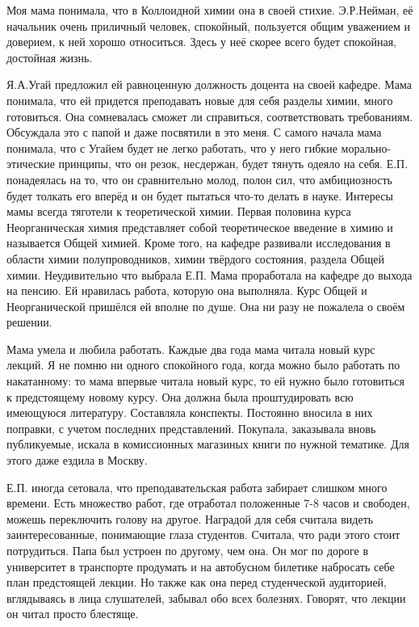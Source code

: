 Моя мама понимала, что в Коллоидной химии она в своей стихие. Э.Р.Нейман, её начальник очень приличный человек, спокойный, пользуется общим уважением и доверием, к ней хорошо относиться. Здесь у неё скорее всего будет спокойная, достойная жизнь.

Я.А.Угай предложил ей равноценную должность доцента на своей кафедре. Мама понимала, что ей придется преподавать новые для себя разделы химии, много готовиться. Она сомневалась сможет ли справиться, соответствовать требованиям. Обсуждала это с папой и даже посвятили в это меня. С самого начала мама понимала, что с Угайем будет не легко работать, что у него гибкие морально-этические принципы, что он резок, несдержан, будет тянуть одеяло на себя. Е.П. понадеялась на то, что он сравнительно молод, полон сил, что амбициозность будет толкать его вперёд и он будет пытаться что-то делать в науке. Интересы мамы всегда тяготели к теоретической химии. Первая половина курса Неорганическая химия представляет собой теоретическое введение в химию и называется Общей химией. Кроме того, на кафедре развивали исследования в области химии полупроводников, химии твёрдого состояния, раздела Общей химии. Неудивительно что выбрала Е.П. Мама проработала на кафедре до выхода на пенсию. Ей нравилась работа, которую она выполняла. Курс Общей и Неорганической пришёлся ей вполне по душе. Она ни разу не пожалела о своём решении.

Мама умела и любила работать. Каждые два года мама читала новый курс лекций. Я не помню ни одного спокойного года, когда можно было работать по накатанному: то мама впервые читала новый курс, то ей нужно было готовиться к предстоящему новому курсу. Она должна была проштудировать всю имеющуюся литературу. Составляла конспекты. Постоянно вносила в них поправки, с учетом последних представлений. Покупала, заказывала вновь публикуемые, искала в комиссионных магазиных книги по нужной тематике. Для этого даже ездила в Москву.

Е.П. иногда сетовала, что преподавательская работа забирает слишком много времени. Есть множество работ, где отработал положенные 7-8 часов и свободен, можешь переключить голову на другое. Наградой для себя считала видеть заинтересованные, понимающие глаза студентов. Считала, что ради этого стоит потрудиться. Папа был устроен по другому, чем она. Он мог по дороге в университет в транспорте продумать и на автобусном билетике набросать себе план предстоящей лекции. Но также как она перед студенческой аудиторией, вглядываясь в лица слушателей, забывал обо всех болезнях. Говорят, что лекции он читал просто блестяще.

